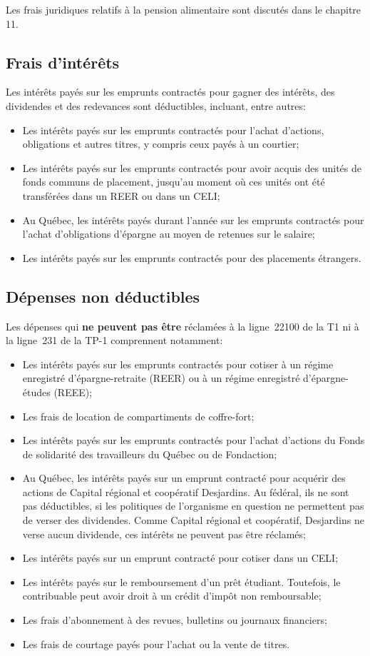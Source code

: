 Les frais juridiques relatifs à la pension alimentaire sont discutés dans le chapitre 11.

\subsection{Frais d'intérêts}
Les intérêts payés sur les emprunts contractés pour gagner des intérêts, des dividendes et des redevances sont déductibles, incluant, entre autres:
\begin{itemize}
	\item Les intérêts payés sur les emprunts contractés pour l'achat d'actions, obligations et autres titres, y compris ceux payés à un courtier;
	\item Les intérêts payés sur les emprunts contractés pour avoir acquis des unités de fonds communs de placement, jusqu'au moment où ces unités ont été transférées dans un REER ou dans un CELI; 
	\item Au Québec, les intérêts payés durant l'année sur les emprunts contractés pour l'achat d'obligations d'épargne au moyen de retenues sur le salaire;
	\item Les intérêts payés sur les emprunts contractés pour des placements étrangers.
\end{itemize}


\subsection{Dépenses non déductibles}
Les dépenses qui \textbf{ne peuvent pas être} réclamées à la ligne~22100 de la T1 ni à la ligne~231 de la TP-1 comprennent notamment:
\begin{itemize}
	\item Les intérêts payés sur les emprunts contractés pour cotiser à un régime enregistré d'épargne-retraite (REER) ou à un régime enregistré d'épargne-études (REEE);
	\item Les frais de location de compartiments de coffre-fort;
	\item Les intérêts payés sur les emprunts contractés pour l'achat d'actions du Fonds de solidarité des travailleurs du Québec ou de Fondaction;
	\item Au Québec, les intérêts payés sur un emprunt contracté pour acquérir des actions de Capital régional et coopératif Desjardins. Au fédéral, ils ne sont pas déductibles, si les politiques de l'organisme en question ne permettent pas de verser des dividendes. Comme Capital régional et coopératif, Desjardins ne verse aucun dividende, ces intérêts ne peuvent pas être réclamés;
	\item Les intérêts payés sur un emprunt contracté pour cotiser dans un CELI;
	\item Les intérêts payés sur le remboursement d'un prêt étudiant. Toutefois, le contribuable peut avoir droit à un crédit d'impôt non remboursable; 
	\item Les frais d'abonnement à des revues, bulletins ou journaux financiers;
	\item Les frais de courtage payés pour l'achat ou la vente de titres.
\end{itemize}



